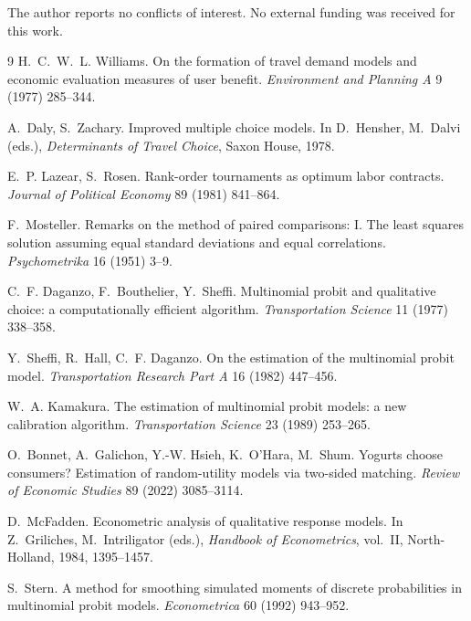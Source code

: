 \documentclass[12pt]{article}
\theoremstyle{remark}
\begin{document}
The author reports no conflicts of interest. No external funding was
received for this work.

\begin{thebibliography}{9}
 H.~C.~W.~L. Williams. On the
formation of travel demand models and economic evaluation measures of
user benefit. \emph{Environment and Planning A} 9 (1977) 285--344.

 A.~Daly, S.~Zachary.
Improved multiple choice models. In D.~Hensher, M.~Dalvi (eds.),
\emph{Determinants of Travel Choice}, Saxon House, 1978.

 E.~P. Lazear, S.~Rosen.
Rank-order tournaments as optimum labor contracts. \emph{Journal of
Political Economy} 89 (1981) 841--864.

 F.~Mosteller. Remarks on the
method of paired comparisons: I. The least squares solution assuming
equal standard deviations and equal correlations. \emph{Psychometrika}
16 (1951) 3--9.

 C.~F. Daganzo, F.~Bouthelier, Y.~Sheffi.
Multinomial probit and qualitative choice: a computationally efficient
algorithm. \emph{Transportation Science} 11 (1977) 338--358.

Y.~Sheffi, R.~Hall, C.~F. Daganzo. On the estimation of the multinomial
probit model. \emph{Transportation Research Part A} 16 (1982) 447--456.

 W.~A. Kamakura. The estimation
of multinomial probit models: a new calibration algorithm.
\emph{Transportation Science} 23 (1989) 253--265.

 O.~Bonnet, A.~Galichon, Y.-W. Hsieh, K.~O'Hara,
M.~Shum. Yogurts choose consumers? Estimation of random-utility models
via two-sided matching. \emph{Review of Economic Studies} 89 (2022)
3085--3114.

 D.~McFadden. Econometric
analysis of qualitative response models. In Z.~Griliches,
M.~Intriligator (eds.), \emph{Handbook of Econometrics}, vol.~II,
North-Holland, 1984, 1395--1457.

 S.~Stern. A method for smoothing
simulated moments of discrete probabilities in multinomial probit
models. \emph{Econometrica} 60 (1992) 943--952.


\end{thebibliography}
\end{document}
